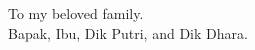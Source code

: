 \thispagestyle{empty}
{}

\vspace*{3cm}

\begin{center}
    To my beloved family.\\
    Bapak, Ibu, Dik Putri, and Dik Dhara.
\end{center}
